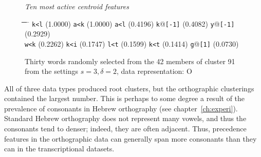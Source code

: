 \begin{figure}[!t]
\begin{mdframed}
\begin{small}
\begin{mdframed}
\textit{Ten most active centroid features}
\vspace{-4pt}
\begin{tabbing}
\hspace*{6ex}\= \hspace*{12ex}\= \hspace*{7ex}\= \hspace*{12ex}\= \hspace*{6ex} \= \hspace*{13ex}\= \hspace*{8ex}\= \hspace*{12ex}\= \hspace*{8ex} \= \hspace*{10ex}\kill
\texttt{k<l} \> (1.0000) \> \texttt{a<k} \> (1.0000) \> \texttt{a<l} \> (0.4196) \> \texttt{k}@\texttt{[-1]} \> (0.4082) \> \texttt{y}@\texttt{[-1]} \> (0.2929)\\
\texttt{w<k} \> (0.2262) \> \texttt{k<i} \> (0.1747) \> \texttt{l<t} \> (0.1599) \> \texttt{k<t} \> (0.1414) \> \texttt{g}@\texttt{[1]} \> (0.0730)
\end{tabbing}
\end{mdframed}
\end{small}
\vspace{-5pt}
\caption{Thirty words randomly selected from the 42 members of cluster 91 from the settings $s=3,\delta =2$, data representation: O}
\label{fig:cluster-91-3-2-O}
\end{mdframed}
\end{figure}

 All of three data types produced root clusters, but the
orthographic clusterings contained the largest number. This is perhaps to some degree a result
of the prevalence of consonants in Hebrew orthography (see chapter~\ref{ch:experi}).
Standard Hebrew orthography does not represent many vowels, and thus the consonants tend to denser; indeed, they are often adjacent. Thus, precedence features in the orthographic data can generally 
span more consonants than they can in the transcriptional datasets. 

